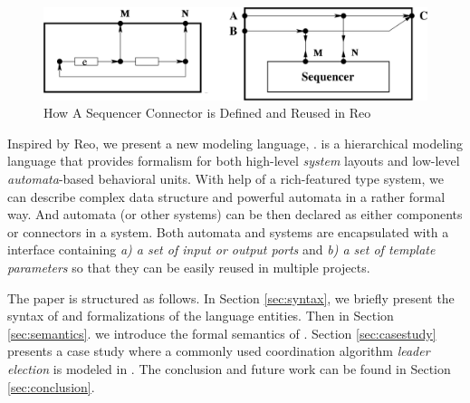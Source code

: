 \begin{figure}[H]
    \centering
    \includegraphics[width=.9\textwidth]{images/reoexample.png}
    \caption{How A Sequencer Connector is Defined and Reused in Reo \cite{MengReoUml2011}}
    \label{fig:reoexample}
\end{figure}

Inspired by Reo, we present a new modeling language, \lang{}. \lang{} is a hierarchical modeling language that provides formalism for both high-level \emph{system} layouts and low-level \emph{automata}-based behavioral units. With help of a rich-featured type system, we can describe complex data structure and powerful automata in a rather formal way. And automata (or other systems) can be then declared as either components or connectors in a system. Both automata and systems are encapsulated with a interface containing \emph{a) a set of input or output ports} and \emph{b) a set of template parameters} so that they can be easily reused in multiple projects. 

The paper is structured as follows. In Section \ref{sec:syntax}, we briefly present the syntax of \lang{} and formalizations of the language entities. Then in Section \ref{sec:semantics}. we introduce the formal semantics of \lang{}. Section \ref{sec:casestudy} presents a case study where a commonly used coordination algorithm \emph{leader election} is modeled in \lang{}. The conclusion and future work can be found in Section \ref{sec:conclusion}.